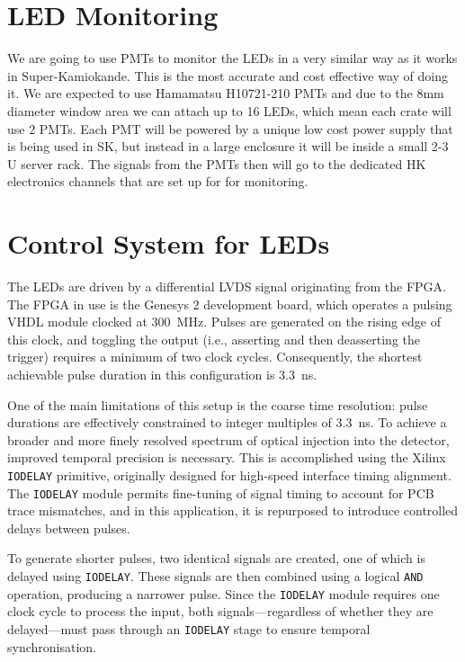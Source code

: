 \documentclass[a4paper,11pt]{article}
\begin{document}
\section{LED Monitoring}

We are going to use PMTs to monitor the LEDs in a very similar way as it works in Super-Kamiokande. This is the most accurate and cost effective way of doing it. We are expected to use Hamamatsu H10721-210 PMTs and due to the 8mm diameter window area we can attach up to 16 LEDs, which mean each crate will use 2 PMTs. Each PMT will be powered by a unique low cost power supply that is being used in SK, but instead in a large enclosure it will be inside a small 2-3 U server rack. The signals from the PMTs then will go to the dedicated HK electronics channels that are set up for for monitoring.

\section{Control System for LEDs}

The LEDs are driven by a differential LVDS signal originating from the FPGA. The FPGA in use is the Genesys 2 \cite{Genesys2} development board, which operates a pulsing VHDL module clocked at \SI{300}{\mega\hertz}. Pulses are generated on the rising edge of this clock, and toggling the output (i.e., asserting and then deasserting the trigger) requires a minimum of two clock cycles. Consequently, the shortest achievable pulse duration in this configuration is \SI{3.3}{\nano\second}.

One of the main limitations of this setup is the coarse time resolution: pulse durations are effectively constrained to integer multiples of \SI{3.3}{\nano\second}. To achieve a broader and more finely resolved spectrum of optical injection into the detector, improved temporal precision is necessary. This is accomplished using the Xilinx \texttt{IODELAY} primitive, originally designed for high-speed interface timing alignment. The \texttt{IODELAY} module permits fine-tuning of signal timing to account for PCB trace mismatches, and in this application, it is repurposed to introduce controlled delays between pulses.

To generate shorter pulses, two identical signals are created, one of which is delayed using \texttt{IODELAY}. These signals are then combined using a logical \texttt{AND} operation, producing a narrower pulse. Since the \texttt{IODELAY} module requires one clock cycle to process the input, both signals—regardless of whether they are delayed—must pass through an \texttt{IODELAY} stage to ensure temporal synchronisation.
\end{document}

